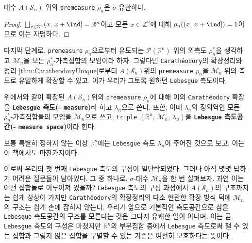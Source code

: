 \begin{proposition}
    대수 $A(\mathcal{S}_n)$ 위의 \texttt{premeasure} $\rho_n$은 $\sigma$-유한하다.
\end{proposition}

\begin{proof}
    $\bigsqcup_{x\in\mathbb{Z}^n}(x,\,x+\ind]=\mathbb{R}^n$이고 모든 $x\in\mathbb{Z}^n$에 대해 $\rho_n((x,\,x+\ind])=1$이므로 이는 자명하다.
\end{proof}

마지막 단계로, \texttt{premeasure} $\rho_n$으로부터 유도되는 $\mathcal{P}(\mathbb{R}^n)$ 위의 외측도 $\rho_n^*$을 생각하고 $\mathcal{M}_n$을 모든 $\rho_n^*$-가측집합의 모임이라 하자. 그렇다면 \texttt{Carath\'eodory}의 확장정리와 정리 \ref{thm:CaratheodoryUnique}로부터 $A(\mathcal{S}_n)$위의 \texttt{premeasure} $\rho_n$을 $\mathcal{M}_n$ 위의 측도로 유일하게 확장할 수 있고, 이가 우리가 그토록 원하던 \texttt{Lebesgue} 측도이다.

\begin{definition}
    위에서와 같이 확장된 $A(\mathcal{S}_n)$위의 \texttt{premeasure} $\rho_n$에 대해 이의 \texttt{Carath\'eodory} 확장을 \textbf{\texttt{Lebesgue} 측도(- \texttt{measure})}라 하고 $\lambda_n$으로 쓴다. 또한, 이때 $\lambda_n$의 정의역인 모든 $\rho_n^*$-가측집합들의 모임을 $\mathcal{M}_n$으로 쓰고, \texttt{triple} $(\mathbb{R}^n,\,\mathcal{M}_n,\,\lambda_n)$을 \textbf{\texttt{Lebesgue} 측도공간(- \texttt{measure space})}이라 한다.
\end{definition}

보통 특별히 정하지 않는 이상 $\mathbb{R}^n$에는 \texttt{Lebesgue} 측도 $\lambda_n$이 주어진 것으로 보고, 이는 이 책에서도 마찬가지이다.

이로써 우리의 첫 번째 \texttt{Lebesgue} 측도의 구성이 일단락되었다. 그러나 아직 몇몇 답하기 어려운 질문들이 남아있다. 그 중 하나로, $\sigma$-대수 $\mathcal{M}_n$을 한 번 살펴보자. 과연 이는 어떤 집합들로 이루어져 있을까? \texttt{Lebesgue} 측도의 구성 과정에서 $A(\mathcal{S}_n)$의 구조까지는 쉽게 상상이 가지만 \texttt{Carath\'eodory}의 확장정리의 다소 현란한 확장 방식 덕에 $\mathcal{M}_n$의 구조는 쉽게 손에 잡히지 않는다. 우리가 앞으로 기본적인 측도공간으로 삼을 \texttt{Lebesgue} 측도공간의 구조를 모른다는 것은 그다지 유쾌한 일이 아니며, 이는 곧 \texttt{Lebesgue} 측도의 구성은 마쳤지만 $\mathbb{R}^n$의 부분집합 중에서 \texttt{Lebesgue} 측도로써 잴 수 있는 집합과 그렇지 않은 집합을 구별할 수 있는 기준은 여전히 모호하다는 뜻이다.

